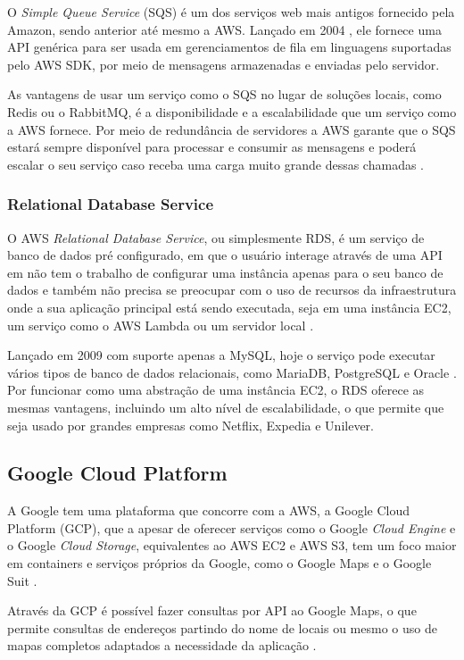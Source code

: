 \indent
\par O \textit{Simple Queue Service} (SQS) é um dos serviços web mais antigos fornecido pela Amazon, sendo anterior até mesmo a AWS. Lançado em 2004 \cite{JeffBarr}, ele fornece uma API genérica para ser usada em gerenciamentos de fila em linguagens suportadas pelo AWS SDK, por meio de mensagens armazenadas e enviadas pelo servidor.
\indent
\par As vantagens de usar um serviço como o SQS no lugar de soluções locais, como Redis ou o RabbitMQ, é a disponibilidade e a escalabilidade que um serviço como a AWS fornece. Por meio de redundância de servidores a AWS garante que o SQS estará sempre disponível para processar e consumir as mensagens e poderá escalar o seu serviço caso receba uma carga muito grande dessas chamadas \cite{AWSSQS}.

\subsubsection{Relational Database Service}

\indent
\par O AWS \textit{Relational Database Service}, ou simplesmente RDS, é um serviço de banco de dados pré configurado, em que o usuário interage através de uma API em não tem o trabalho de configurar uma instância apenas para o seu banco de dados e também não precisa se preocupar com o uso de recursos da infraestrutura onde a sua aplicação principal está sendo executada, seja em uma instância EC2, um serviço como o AWS Lambda ou um servidor local \cite{AWSRDS_B}.
\indent
\par Lançado em 2009 com suporte apenas a MySQL, hoje o serviço pode executar vários tipos de banco de dados relacionais, como MariaDB, PostgreSQL e Oracle \cite{AWSRDS}. Por funcionar como uma abstração de uma instância EC2, o RDS oferece as mesmas vantagens, incluindo um alto nível de escalabilidade, o que permite que seja usado por grandes empresas como Netflix, Expedia e Unilever.

\subsection{Google Cloud Platform}

\indent
\par A Google tem uma plataforma que concorre com a AWS, a Google Cloud Platform (GCP), que a apesar de oferecer serviços como o Google \textit{Cloud Engine} e o Google \textit{Cloud Storage}, equivalentes ao AWS EC2 e AWS S3, tem um foco maior em containers e serviços próprios da Google, como o Google Maps e o Google Suit \cite{ZdNet}.
\indent
\par Através da GCP é possível fazer consultas por API ao Google Maps, o que permite consultas de endereços partindo do nome de locais ou mesmo o uso de mapas completos adaptados a necessidade da aplicação \cite{GMP}.

